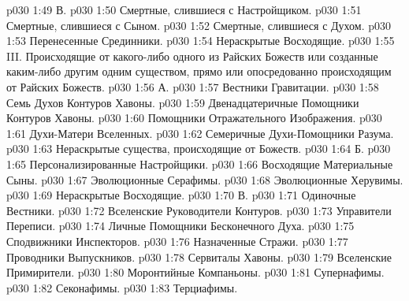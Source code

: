\vs p030 1:49 \pc В. 
\vs p030 1:50 \bibnobreakspace Смертные, слившиеся с Настройщиком.
\vs p030 1:51 \bibnobreakspace Смертные, слившиеся с Сыном.
\vs p030 1:52 \bibnobreakspace Смертные, слившиеся с Духом.
\vs p030 1:53 \bibnobreakspace Перенесенные Срединники.
\vs p030 1:54 \bibnobreakspace Нераскрытые Восходящие.
\vs p030 1:55 \pc III.  Происходящие от какого\hyp{}либо одного из Райских Божеств или созданные каким\hyp{}либо другим одним существом, прямо или опосредованно происходящим от Райских Божеств.
\vs p030 1:56 \pc А. 
\vs p030 1:57 \bibnobreakspace Вестники Гравитации.
\vs p030 1:58 \bibnobreakspace Семь Духов Контуров Хавоны.
\vs p030 1:59 \bibnobreakspace Двенадцатеричные Помощники Контуров Хавоны.
\vs p030 1:60 \bibnobreakspace Помощники Отражательного Изображения.
\vs p030 1:61 \bibnobreakspace Духи\hyp{}Матери Вселенных.
\vs p030 1:62 \bibnobreakspace Семеричные Духи\hyp{}Помощники Разума.
\vs p030 1:63 \bibnobreakspace Нераскрытые существа, происходящие от Божеств.
\vs p030 1:64 \pc Б. 
\vs p030 1:65 \bibnobreakspace Персонализированные Настройщики.
\vs p030 1:66 \bibnobreakspace Восходящие Материальные Сыны.
\vs p030 1:67 \bibnobreakspace Эволюционные Серафимы.
\vs p030 1:68 \bibnobreakspace Эволюционные Херувимы.
\vs p030 1:69 \bibnobreakspace Нераскрытые Восходящие.
\vs p030 1:70 \pc В. 
\vs p030 1:71 \bibnobreakspace Одиночные Вестники.
\vs p030 1:72 \bibnobreakspace Вселенские Руководители Контуров.
\vs p030 1:73 \bibnobreakspace Управители Переписи.
\vs p030 1:74 \bibnobreakspace Личные Помощники Бесконечного Духа.
\vs p030 1:75 \bibnobreakspace Сподвижники Инспекторов.
\vs p030 1:76 \bibnobreakspace Назначенные Стражи.
\vs p030 1:77 \bibnobreakspace Проводники Выпускников.
\vs p030 1:78 \bibnobreakspace Сервиталы Хавоны.
\vs p030 1:79 \bibnobreakspace Вселенские Примирители.
\vs p030 1:80 \bibnobreakspace Моронтийные Компаньоны.
\vs p030 1:81 \bibnobreakspace Супернафимы.
\vs p030 1:82 \bibnobreakspace Секонафимы.
\vs p030 1:83 \bibnobreakspace Терциафимы.
